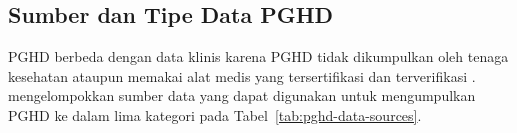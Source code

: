 \subsection{Sumber dan Tipe Data PGHD}\label{studi-sumber-tipe-pghd}

PGHD berbeda dengan data klinis karena PGHD tidak dikumpulkan oleh tenaga kesehatan ataupun memakai alat medis yang tersertifikasi dan terverifikasi \parencite{Cohen_Keller_Hayes_Dorr_Ash_Sittig_2016_PGHD_Integration_EHR}.
\textcite{Khatiwada_Yang_Lin_Blobel_2024_PGHD_Understanding} mengelompokkan sumber data yang dapat digunakan untuk mengumpulkan PGHD ke dalam lima kategori pada Tabel~\ref{tab:pghd-data-sources}.

